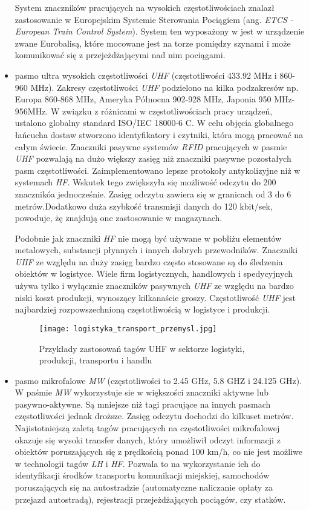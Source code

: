 \begin{itemize}
	 System znaczników pracujących na wysokich częstotliwościach znalazł zastosowanie w Europejskim Systemie Sterowania Pociągiem (ang. \emph{ETCS - European Train Control System}). System ten wyposażony w jest w urządzenie zwane Eurobalisą, które mocowane jest na torze pomiędzy szynami i może komunikować się z przejeżdżającymi nad nim pociągami.


	\item pasmo ultra wysokich częstotliwości \emph{UHF} (częstotliwości 433.92 MHz i 860-960 MHz).
Zakresy częstotliwości \emph{UHF} podzielono na kilka podzakresów np. Europa 860-868 MHz, Ameryka Północna 902-928 MHz, Japonia  950 MHz-956MHz. W związku z różnicami w częstotliwościach pracy urządzeń, ustalono globalny standard ISO/IEC 18000-6 C. W celu objęcia globalnego łańcucha dostaw stworzono identyfikatory i czytniki, która mogą pracować na całym świecie. Znaczniki pasywne systemów \emph{RFID} pracujących w pasmie \emph{UHF} pozwalają na dużo większy zasięg niż znaczniki pasywne pozostałych pasm częstotliwości. Zaimplementowano lepsze protokoły antykolizyjne niż w systemach \emph{HF}. Wskutek tego zwiększyła się możliwość odczytu do 200 znacznikóa jednocześnie. Zasięg odczytu zawiera się w granicach od 3 do 6 metrów.Dodatkowo duża szybkość transmisji danych do 120 kbit/sek, powoduje, żę znajdują one zastosowanie w magazynach.

Podobnie jak znaczniki \emph{HF} nie mogą być używane w pobliżu elementów metalowych, substancji płynnych i innych dobrych przewodników. 
Znaczniki \emph{UHF} ze względu na duży zasięg bardzo często stosowane są do śledzenia obiektów w logistyce. Wiele firm logistycznych, handlowych i spedycyjnych używa tylko i wyłącznie znaczników pasywnych \emph{UHF} ze względu na bardzo niski koszt produkcji, wynoszący kilkanaście groszy. 
Częstotliwość \emph{UHF} jest najbardziej rozpowszechnioną częstotliwością w logistyce i produkcji.

	\begin{figure}[h!]
	\centering
	    \texttt{[image: logistyka\_transport\_przemysl.jpg]}
	    \caption{Przykłady zastosowań tagów UHF w sektorze logistyki, produkcji, transportu i handlu}
	\end{figure}

	\item pasmo mikrofalowe \emph{MW} (częstotliwości to 2.45 GHz, 5.8 GHZ i 24.125 GHz).
W paśmie \emph{MW} wykorzystuje sie w większości znaczniki aktywne lub pasywno-aktywne. Są  mniejsze niż tagi pracujące na innych pasmach częstotliwości jednak droższe. Zasięg odczytu dochodzi do kilkuset metrów. Najistotniejszą zaletą tagów pracujących na częstotliwości mikrofalowej okazuje się wysoki transfer danych, który  umożliwił odczyt informacji z obiektów poruszających się z prędkością ponad 100 km/h, co nie jest możliwe w technologii tagów \emph{LH} i \emph{HF}. Pozwala to na wykorzystanie ich do identyfikacji środków transportu komunikacji miejskiej, samochodów poruszających się  na autostradzie (automatyczne naliczanie opłaty za przejazd autostradą), rejestracji przejeżdżających pociągów, czy statków.


\end{itemize}
